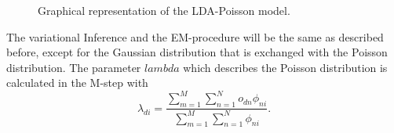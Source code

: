 \begin{figure}[h!]
\centering
\def\svgwidth{0.8\textwidth}

\caption{Graphical representation of the LDA-Poisson model.}
\label{fig:LDAPoisson}
\end{figure}

The variational Inference and the EM-procedure will be the same as described before, except for the Gaussian distribution that is exchanged with the Poisson distribution. The parameter $lambda$ which describes the Poisson distribution is calculated in the M-step with
\begin{equation}
 \lambda_{di} = \frac{\sum_{m=1}^M \sum_{n=1}^N o_{dn} \phi_{ni} }{\sum_{m=1}^M \sum_{n=1}^N  \phi_{ni}}.
\end{equation}



% 
% 
% 
% 
% 
% 
